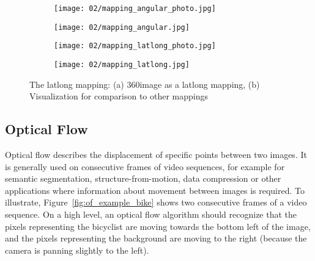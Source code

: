 \begin{figure}
    \quad
    \begin{subfigure}[b]{0.5\textwidth}            
            \centering
            \texttt{[image: 02/mapping\_angular\_photo.jpg]}
            \caption{}
    \end{subfigure}%
    \begin{subfigure}[b]{0.5\textwidth}
            \centering
            \texttt{[image: 02/mapping\_angular.jpg]}
            \caption{}
    \end{subfigure}
    \caption[Angular mapping]{The angular mapping: (a) 360\degree image as an angular mapping, (b) Visualization for comparison to other mappings}\label{fig:angular-intro}

    \quad
    \begin{subfigure}[b]{0.5\textwidth}            
            \centering
            \texttt{[image: 02/mapping\_latlong\_photo.jpg]}
            \caption{}
    \end{subfigure}%
    \begin{subfigure}[b]{0.5\textwidth}
            \centering
            \texttt{[image: 02/mapping\_latlong.jpg]}
            \caption{}
    \end{subfigure}
    \caption[Latlong mapping]{The latlong mapping: (a) 360\degree image as a latlong mapping, (b) Visualization for comparison to other mappings}\label{fig:latlong-intro}
  \end{figure}


\subsection{Optical Flow}

Optical flow describes the displacement of specific points between two images. It is generally used on consecutive frames of video sequences, for example for semantic segmentation, structure-from-motion, data compression or other applications where information about movement between images is required. To illustrate, Figure~\ref{fig:of_example_bike} shows two consecutive frames of a video sequence. On a high level, an optical flow algorithm should recognize that the pixels representing the bicyclist are moving towards the bottom left of the image, and the pixels representing the background are moving to the right (because the camera is panning slightly to the left).

